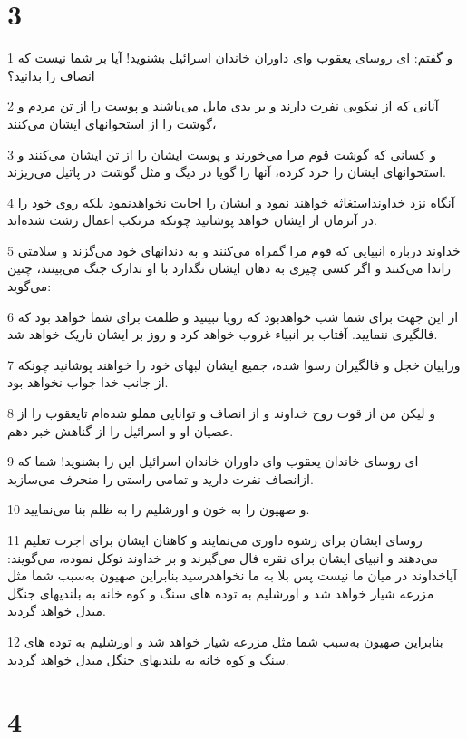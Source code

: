 \chapter{3}

\par 1 و گفتم: ای روسای یعقوب و‌ای داوران خاندان اسرائیل بشنوید! آیا بر شما نیست که انصاف را بدانید؟
\par 2 آنانی که از نیکویی نفرت دارند و بر بدی مایل می‌باشند و پوست را از تن مردم و گوشت را از استخوانهای ایشان می‌کنند،
\par 3 و کسانی که گوشت قوم مرا می‌خورند و پوست ایشان را از تن ایشان می‌کنند و استخوانهای ایشان را خرد کرده، آنها را گویا در دیگ و مثل گوشت در پاتیل می‌ریزند.
\par 4 آنگاه نزد خداونداستغاثه خواهند نمود و ایشان را اجابت نخواهدنمود بلکه روی خود را در آنزمان از ایشان خواهد پوشانید چونکه مرتکب اعمال زشت شده‌اند.
\par 5 خداوند درباره انبیایی که قوم مرا گمراه می‌کنند و به دندانهای خود می‌گزند و سلامتی راندا می‌کنند و اگر کسی چیزی به دهان ایشان نگذارد با او تدارک جنگ می‌بینند، چنین می‌گوید:
\par 6 از این جهت برای شما شب خواهدبود که رویا نبینید و ظلمت برای شما خواهد بود که فالگیری ننمایید. آفتاب بر انبیاء غروب خواهد کرد و روز بر ایشان تاریک خواهد شد.
\par 7 وراییان خجل و فالگیران رسوا شده، جمیع ایشان لبهای خود را خواهند پوشانید چونکه از جانب خدا جواب نخواهد بود.
\par 8 و لیکن من از قوت روح خداوند و از انصاف و توانایی مملو شده‌ام تایعقوب را از عصیان او و اسرائیل را از گناهش خبر دهم.
\par 9 ‌ای روسای خاندان یعقوب و‌ای داوران خاندان اسرائیل این را بشنوید! شما که ازانصاف نفرت دارید و تمامی راستی را منحرف می‌سازید.
\par 10 و صهیون را به خون و اورشلیم را به ظلم بنا می‌نمایید.
\par 11 روسای ایشان برای رشوه داوری می‌نمایند و کاهنان ایشان برای اجرت تعلیم می‌دهند و انبیای ایشان برای نقره فال می‌گیرند و بر خداوند توکل نموده، می‌گویند: آیاخداوند در میان ما نیست پس بلا به ما نخواهدرسید.بنابراین صهیون به‌سبب شما مثل مزرعه شیار خواهد شد و اورشلیم به توده های سنگ و کوه خانه به بلندیهای جنگل مبدل خواهد گردید.
\par 12 بنابراین صهیون به‌سبب شما مثل مزرعه شیار خواهد شد و اورشلیم به توده های سنگ و کوه خانه به بلندیهای جنگل مبدل خواهد گردید.

\chapter{4}

